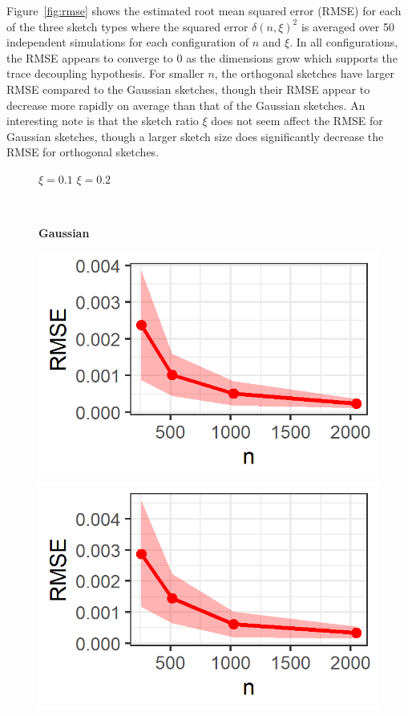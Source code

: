 Figure~\ref{fig:rmse} shows the estimated root mean squared error (RMSE) for each of the three sketch types where the squared error $\delta(n,\xi)^2$ is averaged over 50 independent simulations for each configuration of $n$ and $\xi$. In all configurations, the RMSE appears to converge to 0 as the dimensions grow which supports the trace decoupling hypothesis. For smaller $n$, the orthogonal sketches have larger RMSE compared to the \iid Gaussian sketches, though their RMSE appear to decrease more rapidly on average than that of the \iid Gaussian sketches. An interesting note is that the sketch ratio $\xi$ does not seem affect the RMSE for \iid Gaussian sketches, though a larger sketch size does significantly decrease the RMSE for orthogonal sketches.

\begin{figure}[ht]
\centering
\begin{minipage}[c]{0.21\textwidth}
\vspace{2em}
\end{minipage}
\hfill
\begin{minipage}[c]{0.76\textwidth}
\hfill $\xi=0.1$ \qquad\qquad\; \hfill $\xi=0.2$ \qquad\qquad\; \hfill
\end{minipage} \\
\begin{minipage}[c]{0.21\textwidth}
\hfill \textbf{\iid Gaussian}
\end{minipage}
\hfill
\begin{minipage}[c]{0.76\textwidth}
\includegraphics{images/rmse_sketchgaussian_xi0.1.png}
\includegraphics{images/rmse_sketchgaussian_xi0.2.png}

\end{minipage}
\end{figure}

